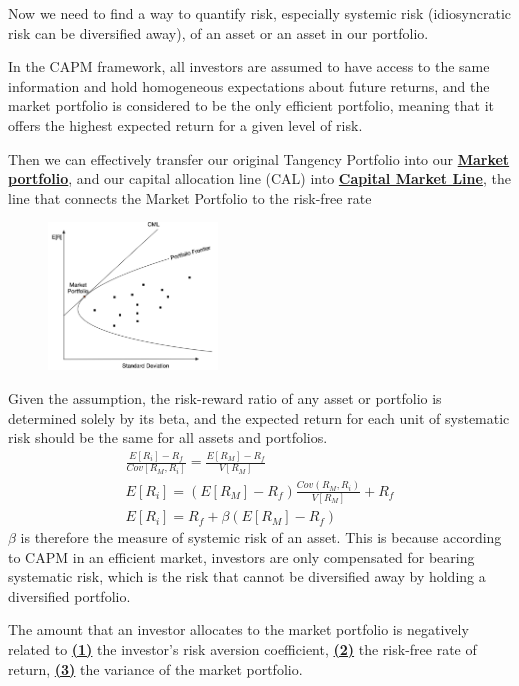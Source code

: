Now we need to find a way to quantify risk, especially systemic risk (idiosyncratic risk can be diversified away), of an asset or an asset in our portfolio. 

\begin{multicols}{2}
    
In the CAPM framework, all investors are assumed to have access to the same information and hold homogeneous expectations about future returns, and the market portfolio is considered to be the only efficient portfolio, meaning that it offers the highest expected return for a given level of risk.\par 

Then we can effectively transfer our original Tangency Portfolio into our \underline{\textbf{Market portfolio}}, and our capital allocation line (CAL) into \underline{\textbf{Capital Market Line}}, the line that connects the Market Portfolio to the risk-free rate
\begin{figure}[H]
    \centering 
    \includegraphics[width =0.4\textwidth]{Figure/cml.png}
\end{figure}
Given the assumption, the risk-reward ratio of any asset or portfolio is determined solely by its beta, and the expected return for each unit of systematic risk should be the same for all assets and portfolios. 
\begin{gather*}
    \frac{E[R_i]-R_f}{Cov[R_M, R_i]} = \frac{E[R_M]-R_f}{V[R_M]}\\[0.1cm]
    E[R_i] = (E[R_M]-R_f)\frac{Cov(R_M,R_i)}{V[R_M]}+R_f\\
    \boxed{E[R_i] =  R_f + \beta(E[R_M]-R_f)}
\end{gather*}
$\beta$ is therefore the measure of systemic risk of an asset. This is because according to CAPM in an efficient market, investors are only compensated for bearing systematic risk, which is the risk that cannot be diversified away by holding a diversified portfolio.

The amount that an investor allocates to the market portfolio is negatively related to \underline{\textbf{(1)}} the investor's risk aversion coefficient, \underline{\textbf{(2)}} the risk-free rate of return, \underline{\textbf{(3)}} the variance of the market portfolio.


\end{multicols}
